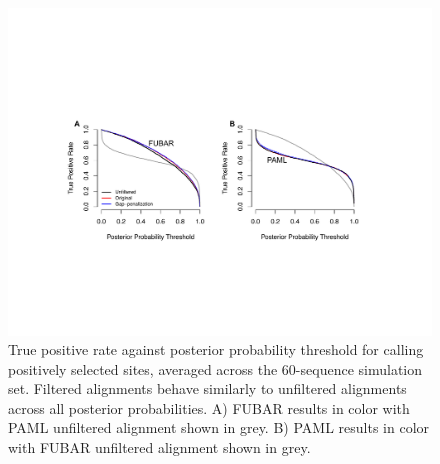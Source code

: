 \documentclass[11pt]{article}
\begin{document}
\begin{figure}[H]
\centerline{\includegraphics[width=5in]{Figures/fulltpr.pdf}}
\caption{\label{fulltpr} True positive rate against posterior probability threshold for calling positively selected sites, averaged across the 60-sequence simulation set. Filtered alignments behave similarly to unfiltered alignments across all posterior probabilities. A) FUBAR results in color with PAML unfiltered alignment shown in grey. B) PAML results in color with FUBAR unfiltered alignment shown in grey. }
\end{figure}

\bigskip
\end{document}
